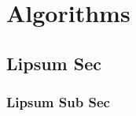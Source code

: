 \chapter{Algorithms}\label{cha:appendix}
\section{Lipsum Sec}
\lipsum[1]
\subsection{Lipsum Sub Sec}
\lipsum[1-10]